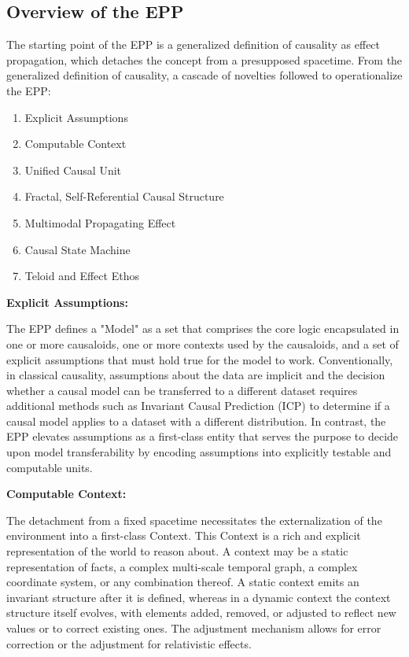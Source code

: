 \subsection{Overview of the EPP}
\label{sec:epp_overview}

The starting point of the EPP is a generalized definition of causality as effect propagation, which detaches the concept from a presupposed spacetime. From the generalized definition of causality, a cascade of novelties followed to operationalize the EPP:

\begin{enumerate}
	\item Explicit Assumptions 
	\item Computable Context
	\item Unified Causal Unit
	\item Fractal, Self-Referential Causal Structure
	\item Multimodal Propagating Effect
	\item Causal State Machine 
	\item Teloid and Effect Ethos
\end{enumerate}


\textbf{Explicit Assumptions:}

The EPP defines a "Model" as a set that comprises the core logic encapsulated in one or more causaloids, one or more contexts used by the causaloids, and a set of explicit assumptions that must hold true for the model to work. Conventionally, in classical causality, assumptions about the data are  implicit and the decision whether a causal model can be transferred to a different dataset requires additional methods such as Invariant Causal Prediction (ICP) to determine if a causal model applies to a dataset with a different distribution. In contrast, the EPP elevates assumptions as a first-class entity that serves the purpose to decide upon model transferability by encoding assumptions into explicitly testable and computable units. 

\newpage

\textbf{Computable Context:} 

The detachment from a fixed spacetime necessitates the externalization of the environment into a first-class Context. This Context is a rich and explicit representation of the world to reason about. A context may be a static representation of facts, a complex multi-scale temporal graph, a complex coordinate system, or any combination thereof. A static context emits an invariant structure after it is defined, whereas in a dynamic context the context structure itself evolves, with elements added, removed, or adjusted to reflect new values or to correct existing ones. The adjustment mechanism allows for error correction or the adjustment for relativistic effects.

